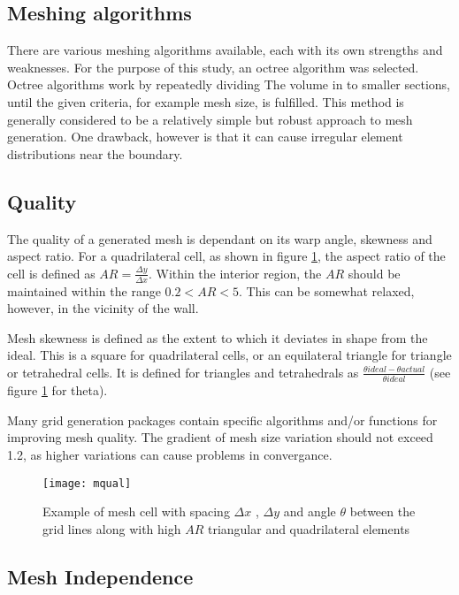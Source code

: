 \subsection{Meshing algorithms}
There are various meshing algorithms available, each with its own strengths and weaknesses. For the purpose of this study, an octree algorithm was selected. Octree algorithms work by repeatedly dividing The volume in to smaller sections, until the given criteria, for example mesh size, is fulfilled. This method is generally considered to be a relatively simple but robust approach to mesh generation. One drawback, however is that it can cause irregular element distributions near the boundary.

\subsection{Quality}

The quality of a generated mesh is dependant on its warp angle, skewness and aspect ratio. For a quadrilateral cell, as shown in figure \ref{fig:mqual}, the aspect ratio of the cell is defined as $AR = \frac{\Delta y} {\Delta x}$. Within the interior region, the $AR$ should be maintained within the range $0.2 < AR < 5$. This can be somewhat relaxed, however, in the vicinity of the wall.

Mesh skewness is defined as the extent to which it deviates in shape from the ideal. This is a square for quadrilateral cells, or an equilateral triangle for triangle or tetrahedral cells. It is defined for triangles and tetrahedrals as $\frac{\theta ideal - \theta actual} {\theta ideal}$ (see figure \ref{fig:mqual} for theta).

Many grid generation packages contain specific algorithms and/or functions for improving mesh quality. The gradient of mesh size variation should not exceed 1.2, as higher variations can cause problems in convergance.

\begin{figure}
  \texttt{[image: mqual]}
  \caption{Example of mesh cell with spacing $\Delta x$ , $\Delta y$ and angle $ \theta $ between the grid lines along with high $AR$ triangular and quadrilateral elements } \label{fig:mqual}
\end{figure}
 
\subsection{Mesh Independence}

